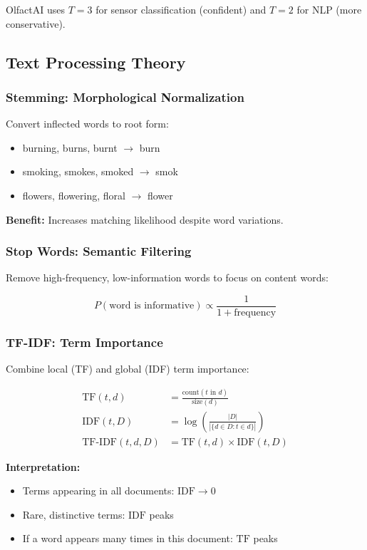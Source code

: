 \documentclass[10pt]{article}
\begin{document}
{OlfactAI uses $T = 3$ for sensor classification (confident) and $T = 2$ for NLP (more conservative).

\subsection{Text Processing Theory}

\subsubsection{Stemming: Morphological Normalization}

Convert inflected words to root form:
\begin{itemize}
    \item burning, burns, burnt $\to$ burn
    \item smoking, smokes, smoked $\to$ smok
    \item flowers, flowering, floral $\to$ flower
\end{itemize}

\textbf{Benefit:} Increases matching likelihood despite word variations.

\subsubsection{Stop Words: Semantic Filtering}

Remove high-frequency, low-information words to focus on content words:

\[
P(\text{word is informative}) \propto \frac{1}{1 + \text{frequency}}
\]

\subsubsection{TF-IDF: Term Importance}

Combine local (TF) and global (IDF) term importance:

\begin{align}
\text{TF}(t, d) &= \frac{\text{count}(t \text{ in } d)}{\text{size}(d)} \\
\text{IDF}(t, D) &= \log\left(\frac{|D|}{|\{d \in D: t \in d\}|}\right) \\
\text{TF-IDF}(t, d, D) &= \text{TF}(t, d) \times \text{IDF}(t, D)
\end{align}

\textbf{Interpretation:}
\begin{itemize}
    \item Terms appearing in all documents: $\text{IDF} \to 0$
    \item Rare, distinctive terms: $\text{IDF}$ peaks
    \item If a word appears many times in this document: $\text{TF}$ peaks
\end{itemize}

}
\end{document}
